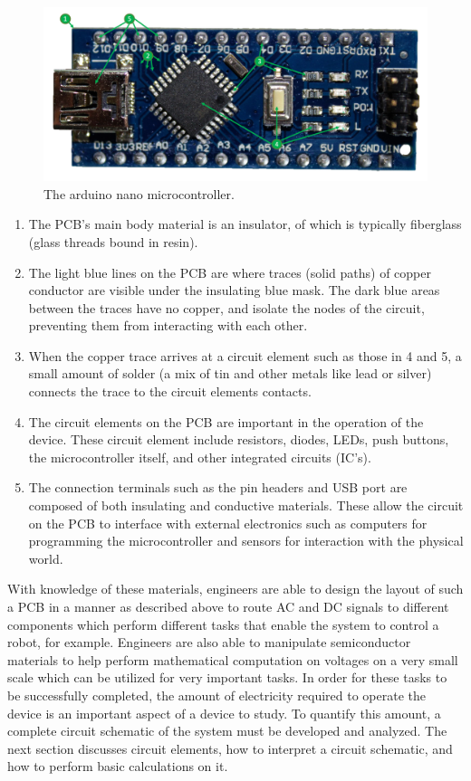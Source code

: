 \documentclass[12pt]{article}
\begin{document}
\begin{figure}[H]
    \centering
    \includegraphics[width=15cm]{photos/prelim/arduinolabeled.png}
    \caption{The arduino nano microcontroller.}
\end{figure}

\begin{enumerate}
    \item The PCB's main body material is an insulator, of which is typically fiberglass (glass threads bound in resin).
    \item The light blue lines on the PCB are where traces (solid paths) of copper conductor are visible under the insulating blue mask. The dark blue areas between the traces have no copper, and isolate the nodes of the circuit, preventing them from interacting with each other.
    \item When the copper trace arrives at a circuit element such as those in 4 and 5, a small amount of solder (a mix of tin and other metals like lead or silver) connects the trace to the circuit elements contacts. 
    \item The circuit elements on the PCB are important in the operation of the device. These circuit element include resistors, diodes, LEDs, push buttons, the microcontroller itself, and other integrated circuits (IC's).
    \item The connection terminals such as the pin headers and USB port are composed of both insulating and conductive materials. These allow the circuit on the PCB to interface with external electronics such as computers for programming the microcontroller and sensors for interaction with the physical world.
\end{enumerate}

With knowledge of these materials, engineers are able to design the layout of such a PCB in a manner as described above to route AC and DC signals to different components which perform different tasks that enable the system to control a robot, for example. Engineers are also able to manipulate semiconductor materials to help perform mathematical computation on voltages on a very small scale which can be utilized for very important tasks. In order for these tasks to be successfully completed, the amount of electricity required to operate the device is an important aspect of a device to study. To quantify this amount, a complete circuit schematic of the system must be developed and analyzed. The next section discusses circuit elements, how to interpret a circuit schematic, and how to perform basic calculations on it. 
\end{document}
